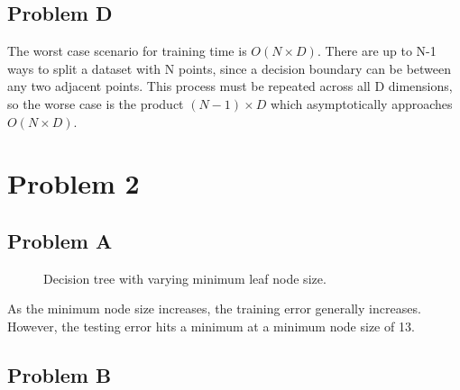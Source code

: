 \documentclass[12pt]{article} %
\begin{document}
\subsection{Problem D}
The worst case scenario for training time is $O(N \times D)$. There are up to N-1 ways to split a dataset with N points, since a decision boundary can be between any two adjacent points. This process must be repeated across all D dimensions, so the worse case is the product $(N - 1) \times D$ which asymptotically approaches $O(N \times D)$.

\section{Problem 2}

\subsection{Problem A}
\begin{figure}[H]
	\vspace{-10mm}
	\caption{Decision tree with varying minimum leaf node size.}
\end{figure}
As the minimum node size increases, the training error generally increases. However, the testing error hits a minimum at a minimum node size of 13.

\subsection{Problem B}
\end{document}
